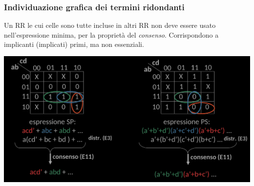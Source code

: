 \documentclass{article}
\begin{document}
\subsubsection{Individuazione grafica dei termini ridondanti}
Un RR le cui celle sono tutte incluse in altri RR
non deve essere usato nell'espressione minima, per la proprietà del \textit{consenso}. Corrispondono a implicanti (implicati) primi, ma non essenziali.
\begin{center}
    \includegraphics[scale=0.55]{ridond.png}
\end{center}
\end{document}
